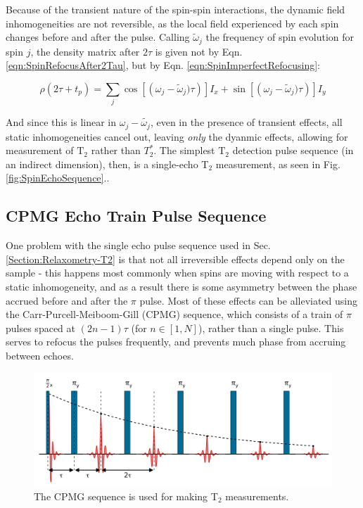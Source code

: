 \documentclass[PaulGanssle-Thesis.tex]{subfiles}
\begin{document}
Because of the transient nature of the spin-spin interactions, the dynamic field inhomogeneities are not reversible, as the local field experienced by each spin changes before and after the pulse. Calling $\tilde{\omega}_{j}$ the frequency of spin evolution for spin $j$, the density matrix after $2\tau$ is given not by Eqn. \ref{eqn:SpinRefocusAfter2Tau}, but by Eqn. \ref{eqn:SpinImperfectRefocusing}:

\begin{equation}
\rho(2\tau + t_{p}) = \sum_{j}\cos\left[\left(\omega_{j}-\tilde{\omega}_{j})\tau\right)\right]I_{x} + \sin\left[\left(\omega_{j}-\tilde{\omega}_{j})\tau\right)\right]I_{y}
\label{eqn:SpinImperfectRefocusing}
\end{equation}

And since this is linear in $\omega_{j} - \tilde{\omega_{j}}$, even in the presence of transient effects, all static inhomogeneities cancel out, leaving \textit{only} the dyanmic effects, allowing for measurement of $\mathrm{T}_{2}$ rather than $T_{2}^*$. The simplest $\mathrm{T}_{2}$ detection pulse sequence (in an indirect dimension), then, is a single-echo T$_2$ measurement, as seen in Fig. \ref{fig:SpinEchoSequence}.\citep{Hahn1950}.

\subsection{CPMG Echo Train Pulse Sequence}
\label{Section:Relaxometry-T2-CPMGPulseSequence}
One problem with the single echo pulse sequence used in Sec. \ref{Section:Relaxometry-T2} is that not all irreversible effects depend only on the sample - this happens most commonly when spins are moving with respect to a static inhomogeneity, and as a result there is some asymmetry between the phase accrued before and after the $\pi$ pulse. Most of these effects can be alleviated using the Carr-Purcell-Meiboom-Gill (CPMG) sequence, which consists of a train of $\pi$ pulses spaced at $(2n-1)\tau$ (for $n \in [1, N]$), rather than a single pulse. This serves to refocus the pulses frequently, and prevents much phase from accruing between echoes.\citep{carr-purcell-1954,Meiboom1958}

\begin{figure}[ht!]
\includegraphics[width=\tw]{figures/relaxometry/cpmg_sequence_demo.png}
\caption{The CPMG sequence is used for making T$_{2}$ measurements.}
\label{fig:CPMGSequence}
\end{figure}
\end{document}
